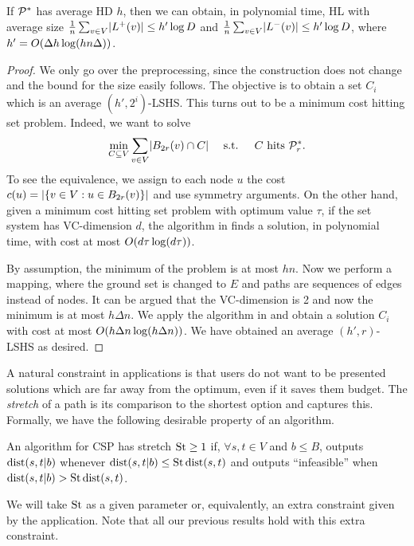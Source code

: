 \begin{theorem}\label{theo:preproc_avg}
If $\mathcal{P}^*$ has average HD $h$, then we can obtain, in polynomial time, HL with average size 
$\frac{1}{n}\sum_{v\in V} \lvert L^+(v)\rvert \leq h'\log D$ and 
$\frac{1}{n}\sum_{v\in V} \lvert L^-(v)\rvert \leq h'\log D$,
where $h'=O(\Delta h\log (hn\Delta))$.
\end{theorem}
\begin{proof}
We only go over the preprocessing, since the construction does not change and the bound for the size easily follows. 
The objective is to obtain a set $C_i$ which is an average $(h',2^i)$-LSHS.
This turns out to be a minimum cost hitting set problem.
Indeed, we want to solve
\[
\min_{C\subseteq V} \sum_{v\in V}\lvert B_{2r}(v)\cap C\rvert  \quad \text{ s.t. } \quad C \text{ hits } \mathcal{P}^*_r.
\]
To see the equivalence, we assign to each node $u$ the cost $c(u)=\lvert\{v\in V: u\in B_{2r}(v)\}\rvert$ and use symmetry arguments.
On the other hand, given a minimum cost hitting set problem with optimum value $\tau$, if the set system has VC-dimension $d$, the algorithm in \cite{vc_dim_hitting} finds a solution, in polynomial time, with cost at most $O(d\tau\log(d\tau))$.

By assumption, the minimum of the problem is at most $hn$.
Now we perform a mapping, where the ground set is changed to $E$ and paths are sequences of edges instead of nodes.
It can be argued that the VC-dimension is 2 and now the minimum is at most $h\Delta n$.
We apply the algorithm in \cite{vc_dim_hitting} and obtain a solution $C_i$ with cost at most $O(h\Delta n\log(h\Delta n))$.
We have obtained an average $(h',r)$-LSHS as desired.
\end{proof}

A natural constraint in applications is that users do not want to be presented solutions which are far away from the optimum, even if it saves them budget.
The \emph{stretch} of a path is its comparison to the shortest option and captures this.
Formally, we have the following desirable property of an algorithm.

\begin{definition}[Stretch]
An algorithm for CSP has stretch $\operatorname{St}\geq 1$ if, $\forall s,t\in V$ and $b\leq B$, outputs $\mbox{dist}(s,t|b)$ whenever $\mbox{dist}(s,t|b)\leq \operatorname{St}\mbox{dist}(s,t)$ and outputs ``infeasible'' when $\mbox{dist}(s,t|b)>\operatorname{St}\mbox{dist}(s,t)$.
\end{definition}
We will take $\operatorname{St}$ as a given parameter or, equivalently, an extra constraint given by the application. 
Note that all our previous results hold with this extra constraint.
